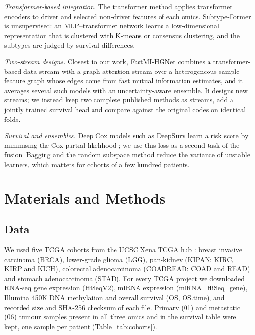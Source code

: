 \documentclass[conference]{IEEEtran}
\begin{document}
\emph{Transformer-based integration.} The transformer method \cite{meng2026motcs} applies transformer encoders
\cite{vaswani2017attention} to driver and selected non-driver features of each omics. Subtype-Former
\cite{yang2022subtypeformer} is unsupervised: an MLP--transformer network learns a low-dimensional representation that
is clustered with K-means or consensus clustering, and the subtypes are judged by survival differences.

\emph{Two-stream designs.} Closest to our work, FastMI-HGNet \cite{fu2026fastmi} combines a transformer-based data stream
with a graph attention stream over a heterogeneous sample--feature graph whose edges come from fast mutual information
estimates, and it averages several such models with an uncertainty-aware ensemble. It designs new streams; we instead
keep two complete published methods as streams, add a jointly trained survival head and compare against the original
codes on identical folds.

\emph{Survival and ensembles.} Deep Cox models such as DeepSurv \cite{katzman2018deepsurv} learn a risk score by
minimising the Cox partial likelihood \cite{cox1972}; we use this loss as a second task of the fusion. Bagging
\cite{breiman1996bagging} and the random subspace method \cite{ho1998subspace} reduce the variance of unstable learners,
which matters for cohorts of a few hundred patients.

\section{Materials and Methods}

\subsection{Data}
\label{sec:data}
We used five TCGA cohorts \cite{weinstein2013tcga} from the UCSC Xena TCGA hub \cite{goldman2020xena}: breast invasive
carcinoma (BRCA), lower-grade glioma (LGG), pan-kidney (KIPAN: KIRC, KIRP and KICH), colorectal adenocarcinoma (COADREAD:
COAD and READ) and stomach adenocarcinoma (STAD). For every TCGA project we downloaded RNA-seq gene expression (HiSeqV2),
miRNA expression (miRNA\_HiSeq\_gene), Illumina 450K DNA methylation and overall survival (OS, OS.time), and recorded size
and SHA-256 checksum of each file. Primary (01) and metastatic (06) tumour samples present in all three omics and in the
survival table were kept, one sample per patient (Table~\ref{tab:cohorts}).
\end{document}
